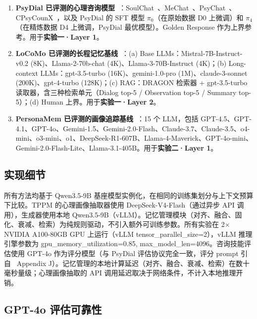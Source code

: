 \documentclass[12pt,a4paper]{article}
\newcommand{\methodname}{\textsc{TPPM}}
\begin{document}
\begin{enumerate}
  \item \textbf{PsyDial 已评测的心理咨询模型~\cite{qiu2025psydial}}：SoulChat~\cite{chen2023soulchat}、MeChat~\cite{qiu2024smile}、PsyChat~\cite{qiu2024psychat}、CPsyCounX~\cite{zhang2024cpsycoun}，以及 PsyDial 的 SFT 模型 $\pi_0$（在原始数据 D0 上微调）和 $\pi_4$（在精炼数据 D4 上微调，PsyDial 最优模型）。Golden Response 作为上界参考。用于\textbf{实验一·Layer 1}。

  \item \textbf{LoCoMo 已评测的长程记忆基线~\cite{maharana2024locomo}}：(a) Base LLMs：Mistral-7B-Instruct-v0.2 (8K)、Llama-2-70b-chat (4K)、Llama-3-70B-Instruct (4K)；(b) Long-context LLMs：gpt-3.5-turbo (16K)、gemini-1.0-pro (1M)、claude-3-sonnet (200K)、gpt-4-turbo (128K)；(c) RAG：DRAGON 检索器 + gpt-3.5-turbo 读取器，含三种检索单元（Dialog top-5 / Observation top-5 / Summary top-5）；(d) Human 上界。用于\textbf{实验一·Layer 2}。

  \item \textbf{PersonaMem 已评测的画像追踪基线~\cite{jiang2025personamem}}：15 个 LLM，包括 GPT-4.5、GPT-4.1、GPT-4o、Gemini-1.5、Gemini-2.0-Flash、Claude-3.7、Claude-3.5、o4-mini、o3-mini、o1、DeepSeek-R1-607B、Llama-4-Maverick、GPT-4o-mini、Gemini-2.0-Flash-Lite、Llama-3.1-405B。用于\textbf{实验二·Layer 1}。
\end{enumerate}

\subsection{实现细节}

所有方法均基于 Qwen3.5-9B 基座模型实例化，在相同的训练集划分与上下文预算下比较。\methodname{} 的心理画像抽取器使用 DeepSeek-V4-Flash（通过异步 API 调用），生成器使用本地 Qwen3.5-9B（vLLM）。记忆管理模块（对齐、融合、固化、衰减、检索）为纯规则驱动，不引入额外可训练参数。所有实验在 2$\times$ NVIDIA A100-80GB GPU 上运行（vLLM tensor\_parallel\_size=2），vLLM 推理引擎参数为 gpu\_memory\_utilization=0.85, max\_model\_len=4096。咨询技能评估使用 GPT-4o 作为评分模型（与 PsyDial 评估协议完全一致，评分 prompt 引自~\cite{qiu2025psydial} Appendix J）。记忆管理的本地计算延迟（对齐、融合、衰减、检索）在数十毫秒量级；心理画像抽取的 API 调用延迟取决于网络条件，不计入本地推理开销。

\subsection{GPT-4o 评估可靠性}
\end{document}
